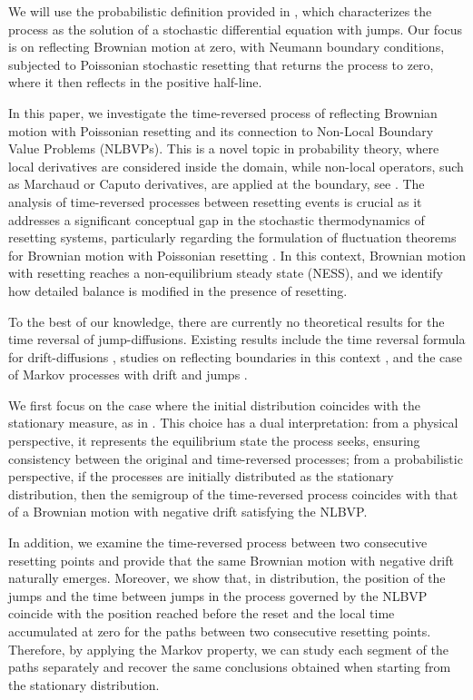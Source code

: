 \documentclass[11pt,a4paper]{article}
\theoremstyle{definition}
\theoremstyle{remark}
\begin{document}
We will use the probabilistic definition provided in \cite{sde-resetting}, which characterizes the process as the solution of a stochastic differential equation with jumps. Our focus is on reflecting Brownian motion at zero, with Neumann boundary conditions, subjected to Poissonian stochastic resetting that returns the process to zero, where it then reflects in the positive half-line.  

In this paper, we investigate the time-reversed process of reflecting Brownian motion with Poissonian resetting and its connection to Non-Local Boundary Value Problems (NLBVPs). This is a novel topic in probability theory, where local derivatives are considered inside the domain, while non-local operators, such as Marchaud or Caputo derivatives, are applied at the boundary, see \cite{boncoldovpag2024,colantoni2023non}.  The analysis of time-reversed processes between resetting events is crucial as it 
	addresses a significant conceptual gap in the stochastic thermodynamics of resetting 
	systems, particularly regarding the formulation of fluctuation theorems for Brownian 
	motion with Poissonian resetting \cite{fluctuation}. In this context, Brownian motion 
	with resetting reaches a non-equilibrium steady state (NESS), and we identify how 
	detailed balance is modified in the presence of resetting.


To the best of our knowledge, there are currently no theoretical results for the time reversal of jump-diffusions. Existing results include the time reversal formula for drift-diffusions \cite{reverse-diffusion1,reverse-diffusion2}, studies on reflecting boundaries in this context \cite{reverse-reflected}, and the case of Markov processes with drift and jumps \cite{conforti22}.  

We first focus on the case where the initial distribution coincides with the stationary measure, as in \cite{reverse-jumps}. This choice has a dual interpretation: from a physical perspective, it represents the equilibrium state the process seeks, ensuring consistency between the original and time-reversed processes; from a probabilistic perspective, if the processes are initially distributed as the stationary distribution, then the semigroup of the time-reversed process coincides with that of a Brownian motion with negative drift satisfying the NLBVP.

In addition, we examine the time-reversed process between two consecutive resetting points and provide that the same Brownian motion with negative drift naturally emerges. Moreover, we show that, in distribution, the position of the jumps and the time between jumps in the process governed by the NLBVP coincide with the position reached before the reset and the local time accumulated at zero for the paths between two consecutive resetting points. Therefore, by applying the Markov property, we can study each segment of the paths separately and recover the same conclusions obtained when starting from the stationary distribution.
\end{document}

